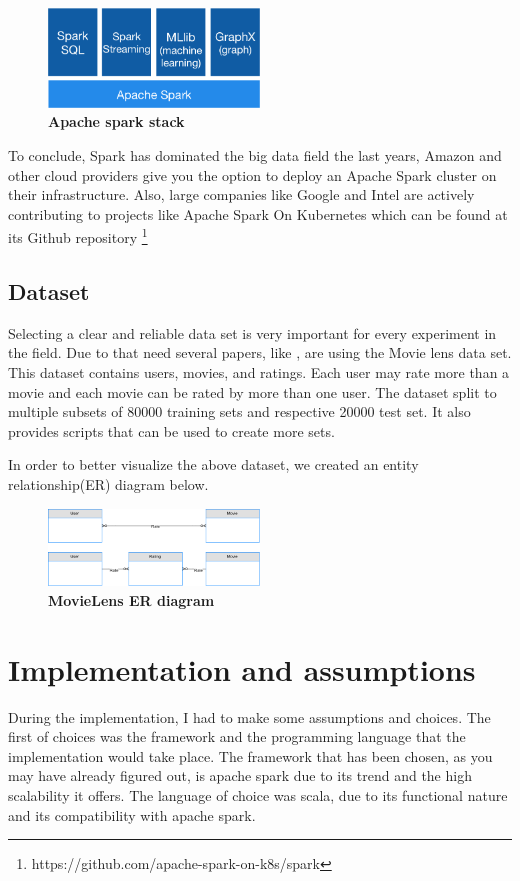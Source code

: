 \begin{figure}[ht]
	\centering
	\includegraphics[width=0.5\textwidth]{../images/spark-stack.png}
	\caption{\bfseries Apache spark stack \cite{ApacheSpark:1}}
	\label{apacheSparkStack}
\end{figure}

To conclude, Spark has dominated the big data field the last years, Amazon and other cloud providers give you the option to deploy an Apache Spark cluster on their infrastructure. Also, large companies like Google and Intel are actively contributing to projects like Apache Spark On Kubernetes which can be found at its Github repository \footnote{https://github.com/apache-spark-on-k8s/spark}

\subsection{Dataset}
Selecting a clear and reliable data set is very important for every experiment in the field. Due to that need several papers, like \cite{levandoski2011recbench}, are using the Movie lens data set. This dataset contains users, movies, and ratings. Each user may rate more than a movie and each movie can be rated by more than one user. The dataset split to multiple subsets of 80000 training sets and respective 20000 test set. It also provides scripts that can be used to create more sets.

In order to better visualize the above dataset, we created an entity relationship(ER) diagram below. \\
\begin{figure}[ht]
	\centering
	\includegraphics[width=0.5\textwidth]{../images/MovieLensDataset.png}
	\caption{\bfseries MovieLens ER diagram \cite{MovieLens:3}}
	\label{movieLensER}
\end{figure}


\section{Implementation and assumptions}
During the implementation, I had to make some assumptions and choices. The first of choices was the framework and the programming language that the implementation would take place. The framework that has been chosen, as you may have already figured out, is apache spark due to its trend and the high scalability it offers. The language of choice was scala, due to its functional nature and its compatibility with apache spark.
